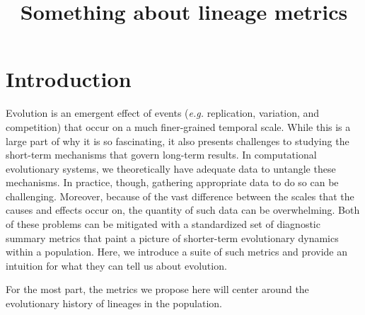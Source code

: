 \documentclass[letterpaper]{article}
\title{Something about lineage metrics}
\begin{document}
\maketitle

\begin{abstract}

\end{abstract}

\section{Introduction}

Evolution is an emergent effect of events (\textit{e.g.} replication, variation, and competition) that occur on a much finer-grained temporal scale. While this is a large part of why it is so fascinating, it also presents challenges to studying the short-term mechanisms that govern long-term results. In computational evolutionary systems, we theoretically have adequate data to untangle these mechanisms. In practice, though, gathering appropriate data to do so can be challenging. Moreover, because of the vast difference between the scales that the causes and effects occur on, the quantity of such data can be overwhelming. Both of these problems can be mitigated with a standardized set of diagnostic summary metrics that paint a picture of shorter-term evolutionary dynamics within a population. Here, we  introduce a suite of such metrics and provide an intuition for what they can tell us about evolution.





For the most part, the metrics we propose here will center around the evolutionary history of lineages in the population.

\end{document}
